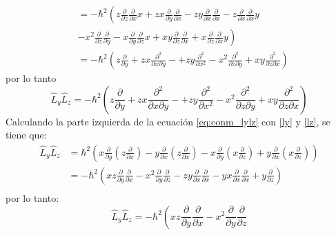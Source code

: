 \documentclass[12pt,letterpaper]{article}
\begin{document}
\begin{enumerate}
\begin{align*}
        &=-\hbar^2 \left(z \frac{\partial}{\partial z}\frac{\partial}{\partial x}x+zx \frac{\partial}{\partial y}\frac{\partial}{\partial x}
        -zy \frac{\partial}{\partial x}\frac{\partial}{\partial x}-
        z \frac{\partial}{\partial x}\frac{\partial}{\partial x}y\right.\\
        &\left. -x^2 \frac{\partial}{\partial z}\frac{\partial}{\partial y}
        -x \frac{\partial}{\partial y}\frac{\partial}{\partial z}x 
        +xy \frac{\partial}{\partial z}\frac{\partial}{\partial x}
        +x \frac{\partial}{\partial z}\frac{\partial}{\partial x}y\right)\\
        &=-\hbar^2 \left(z\frac{\partial}{\partial y}+zx \frac{\partial^2}{ \partial x\partial y}-
        +zy \frac{\partial^2}{ \partial x^2}-x^2 \frac{\partial^2}{ \partial z\partial y}+xy \frac{\partial^2}{ \partial z\partial x} \right)
    \end{align*}
    por lo tanto
    \begin{equation}
        \label{eq:conm_lylz_izq}
        \hat{L}_y\hat{L}_z=-\hbar^2 \left(z\frac{\partial}{\partial y}+zx \frac{\partial^2}{ \partial x\partial y}-
        +zy \frac{\partial^2}{ \partial x^2}-x^2 \frac{\partial^2}{ \partial z\partial y}+xy \frac{\partial^2}{ \partial z\partial x} \right)
    \end{equation}
    Calculando la parte izquierda de la ecuación \ref{eq:conm_lylz} con \ref{ly} y \ref{lz}, se tiene que:
    \begin{align*}
        \hat{L}_y\hat{L}_z&=\hbar^2 \left(x\frac{\partial}{\partial y} \left(z\frac{\partial}{\partial x}\right)-
        y\frac{\partial}{\partial x} \left(z\frac{\partial}{\partial x}\right)  -
        x\frac{\partial}{\partial y} \left(x\frac{\partial}{\partial z}\right) +
        y\frac{\partial}{\partial x} \left(x\frac{\partial}{\partial z}\right) \right)\\
        &=-\hbar^2 \left(xz \frac{\partial}{\partial y}\frac{\partial}{\partial x}-x^2 \frac{\partial}{\partial y}\frac{\partial}{\partial z}
        -zy \frac{\partial}{\partial x}\frac{\partial}{\partial x}-
        yx \frac{\partial}{\partial x}\frac{\partial}{\partial x}+y\frac{\partial}{\partial z}\right)\\
    \end{align*}
    por lo tanto:
    \begin{equation}
        \label{eq:conmu_lylz_der}
        \hat{L}_y\hat{L}_z=-\hbar^2 \left(xz \frac{\partial}{\partial y}\frac{\partial}{\partial x}-x^2 \frac{\partial}{\partial y}\frac{\partial}{\partial z}

\end{equation}
\end{enumerate}
\end{document}
